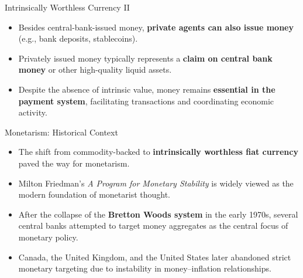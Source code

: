 \documentclass[11pt,aspectratio=169]{beamer}
\begin{document}
\begin{frame}{Intrinsically Worthless Currency II}
\small
\begin{itemize}

    \item Besides central-bank-issued money, \textbf{private agents can also issue money} (e.g., bank deposits, stablecoins).

    \vspace{0.7em}

    \item Privately issued money typically represents a \textbf{claim on central bank money} or other high-quality liquid assets.

    \vspace{0.7em}

    \item Despite the absence of intrinsic value, money remains \textbf{essential in the payment system}, facilitating transactions and coordinating economic activity.
    
\end{itemize}
\end{frame}

\begin{frame}{Monetarism: Historical Context}
\small
\begin{itemize}

    \item The shift from commodity-backed to \textbf{intrinsically worthless fiat currency} paved the way for monetarism.

    \vspace{0.7em}

    \item Milton Friedman’s \textit{A Program for Monetary Stability} \textcite{friedman1960program} is widely viewed as the modern foundation of monetarist thought.

    \vspace{0.7em}

    \item After the collapse of the \textbf{Bretton Woods system} in the early 1970s, several central banks attempted to target money aggregates as the central focus of monetary policy.

    \vspace{0.7em}

    \item Canada, the United Kingdom, and the United States later abandoned strict monetary targeting due to instability in money–inflation relationships.
    
\end{itemize}
\end{frame}
\end{document}
